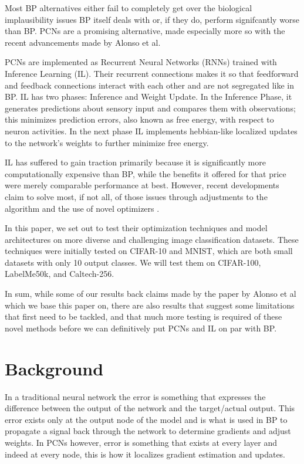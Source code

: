 \documentclass{article}
\theoremstyle{plain}
\theoremstyle{definition}
\theoremstyle{remark}
\begin{document}
Most BP alternatives either fail to completely get over the biological
implausibility issues BP itself deals with or, if they do, perform signifcantly
worse than BP. PCNs are a promising alternative, made especially more so 
with the recent advancements made by Alonso et al. 

PCNs are implemented as Recurrent Neural Networks (RNNs) trained with Inference Learning (IL).
Their recurrent connections makes it so that feedforward and feedback connections 
interact with each other and are not segregated like in BP. IL has two phases:
Inference and Weight Update. In the Inference Phase, it generates predictions 
about sensory input and compares them with observations; this minimizes 
prediction errors, also known as free energy, with respect to neuron activities.
In the next phase IL implements hebbian-like localized updates to the network's 
weights to further minimize free energy. 

IL has suffered to gain traction primarily because it is significantly more
computationally expensive than BP, while the benefits it offered for that 
price were merely comparable performance at best. However, recent 
developments claim to solve most, if not all, of those issues through 
adjustments to the algorithm and the use of novel optimizers \cite{alonso2024understanding}.

In this paper, we set out to test their optimization techniques and model 
architectures on more diverse and challenging image classification datasets.
These techniques were initially tested on CIFAR-10 and MNIST, which are both
small datasets with only 10 output classes. We will test them on CIFAR-100, 
LabelMe50k, and Caltech-256.

In sum, while some of our results back claims made by the paper by Alonso et al 
which we base this paper on, there are also results that suggest some limitations 
that first need to be tackled, and that much more testing is required of these 
novel methods before we can definitively put PCNs and IL on par with BP.


\section{Background}

In a traditional neural network the error is something that expresses
the difference between the output of the network and the target/actual 
output. This error exists only at the output node of the model and is 
what is used in BP to propagate a signal back through the network to 
determine gradients and adjust weights. In PCNs however, error is something
that exists at every layer and indeed at every node, this is how it localizes
gradient estimation and updates. 
\end{document}
